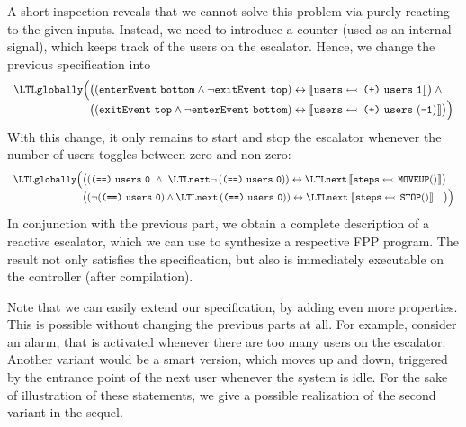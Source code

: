 A short inspection reveals that we cannot solve this problem via
purely reacting to the given inputs. Instead, we need to introduce a
counter (used as an internal signal), which keeps track of the users
on the escalator. Hence, we change the previous specification into
%
\begin{equation*}
  \begin{array}{l}
    \LTLglobally \Big( \big( (\name{enterEvent}~\name{bottom} \wedge \neg \name{exitEvent}~\name{top}) \leftrightarrow \upd{\name{users}}{\name{(+)}~\name{users}~\name{1}} \big) \wedge \mbox{\ } \\
    \phantom{\LTLglobally \Big(} \big( (\name{exitEvent}~\name{top} \wedge \neg \name{enterEvent}~\name{bottom})
    \leftrightarrow \upd{\name{users}}{ \name{(+)}~\name{users}~(\name{-1})} \big) \Big)
  \end{array}
\end{equation*}
%
With this change, it only remains to start and stop the escalator
whenever the number of users toggles between zero and non-zero:
%
\begin{equation*}
  \begin{array}{l}
    \LTLglobally \Big( \big( (\name{(==)}~\name{users}~\name{0} \ \wedge \ \LTLnext \neg \, (\name{(==)}~\name{users}~\name{0})) \leftrightarrow \LTLnext \, \upd{\name{steps}}{\name{MOVEUP}()} \big) \\
    \phantom{\LTLglobally \Big( } \big( ( \neg (\name{(==)}~\name{users}~\name{0}) \wedge \LTLnext \, (\name{(==)}~\name{users}~\name{0})) \leftrightarrow \LTLnext \; \upd{\name{steps}}{\name{STOP}()} \ \ \ \big) \Big)
  \end{array}
\end{equation*}
%
In conjunction with the previous part, we obtain a complete
description of a reactive escalator, which we can use to synthesize a
respective FPP program. The result not only satisfies the
specification, but also is immediately executable on the controller
(after compilation).

Note that we can easily extend our specification, by adding even more
properties. This is possible without changing the previous parts at
all.  For example, consider an alarm, that is activated whenever there
are too many users on the escalator.  Another variant would be a smart
version, which moves up and down, triggered by the entrance point of
the next user whenever the system is idle. For the sake of
illustration of these statements, we give a possible realization of
the second variant in the sequel.

